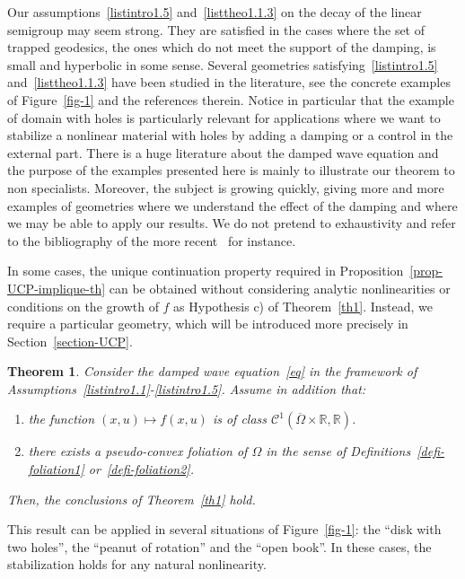\documentclass[10pt]{amsart}
\newtheorem{theo}{Theorem}[section]
\theoremstyle{definition}\newtheorem{defi}[theo]{Definition}\newtheorem{rema}[theo]{Remark}\newtheorem{exam}[theo]{Example}\newtheorem{exem}[theo]{Example}\newtheorem{nota}[theo]{Notation}
\newcommand{\RR}{\mathbb{R}}
\newcommand{\Cc}{\mathcal{C}}
\newcommand*{\alphenumi}{\renewcommand*{\theenumi}{\alph{enumi}}}
\begin{document}
Our assumptions~\eqref{listintro1.5} and~\eqref{listtheo1.1.3} on the decay of the linear semigroup may seem strong. They are satisfied in the cases where the set of trapped geodesics, the ones which do not meet the support of the damping, is small and hyperbolic in some sense. Several geometries satisfying~\eqref{listintro1.5} and~\eqref{listtheo1.1.3} have been studied in the literature, see the concrete examples of Figure~\ref{fig-1} and the references therein. Notice in particular that the example of domain with holes is particularly relevant for applications where we want to stabilize a nonlinear material with holes by adding a damping or a control in the external part. There is a huge literature about the damped wave equation and the purpose of the examples presented here is mainly to illustrate our theorem to non specialists. Moreover, the subject is growing quickly, giving more and more examples of geometries where we understand the effect of the damping and where we may be able to apply our results. We do not pretend to exhaustivity and refer to the bibliography of the more recent~\cite{Lin} for instance.

In some cases, the unique continuation property required in Proposition~\ref{prop-UCP-implique-th} can be obtained without considering analytic nonlinearities or conditions on the growth of $f$ as Hypothesis c) of Theorem~\ref{th1}. Instead, we require a particular geometry, which will be introduced more precisely in Section~\ref{section-UCP}.
\goodbreak

\begin{theo}\label{th2}
Consider the damped wave equation~\eqref{eq} in the framework of Assumptions~\eqref{listintro1.1}-\eqref{listintro1.5}. Assume in addition that:
\begin{enumerate}\alphenumi
\item \label{listtheo1.2.1}the function $(x,u)\mapsto f(x,u)$ is of class $\Cc^1\left(\overline{\Omega}\times \RR,\RR\right)$.
\item \label{listtheo1.2.2}there exists a pseudo-convex foliation of $\Omega$ in the sense of Definitions~\ref{defi-foliation1} or~\ref{defi-foliation2}.
\end{enumerate}
Then, the conclusions of Theorem~\ref{th1} hold.
\end{theo}

This result can be applied in several situations of Figure~\ref{fig-1}: the ``disk with two holes'', the ``peanut of rotation'' and the ``open book''. In these cases, the stabilization holds for any natural nonlinearity.
\end{document}
